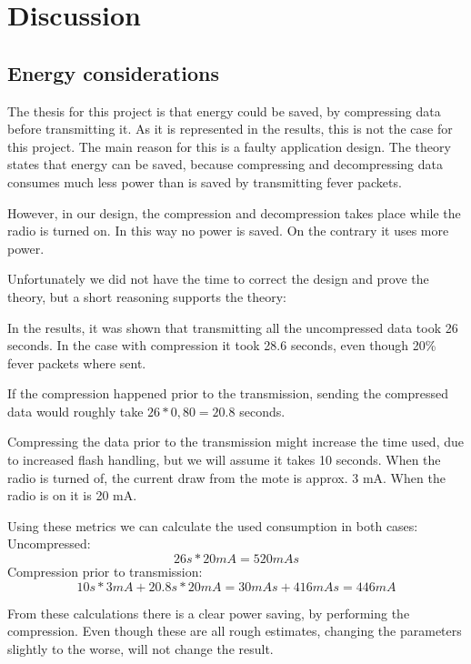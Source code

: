 \chapter{Discussion}

\section{Energy considerations}

The thesis for this project is that energy could be saved, by compressing data before transmitting it. As it is represented in the results, this is not the case for this project. The main reason for this is a faulty application design. 
The theory states that energy can be saved, because compressing and decompressing data consumes much less power than is saved by transmitting fever packets.

However, in our design, the compression and decompression takes place while the radio is turned on. In this way no power is saved. On the contrary it uses more power.

Unfortunately we did not have the time to correct the design and prove the theory, but a short reasoning supports the theory:


In the results, it was shown that transmitting all the uncompressed data took 26 seconds. In the case with compression it took 28.6 seconds, even though 20\% fever packets where sent. 

If the compression happened prior to the transmission, sending the compressed data would roughly take $26*0,80 = 20.8$ seconds. 

Compressing the data prior to the transmission might increase the time used, due to increased flash handling, but we will assume it takes 10 seconds.
When the radio is turned of, the current draw from the mote is approx. 3 mA. When the radio is on it is 20 mA. 

Using these metrics we can calculate the used consumption in both cases:\\
Uncompressed:
\begin{equation}
26 s * 20 mA = 520 mAs
\end{equation}
Compression prior to transmission:
\begin{equation}
10 s * 3 mA + 20.8 s * 20 mA = 30 mAs + 416 mAs  = 446 mA
\end{equation}

From these calculations there is a clear power saving, by performing the compression. Even though these are all rough estimates, changing the parameters slightly to the worse, will not change the result.

